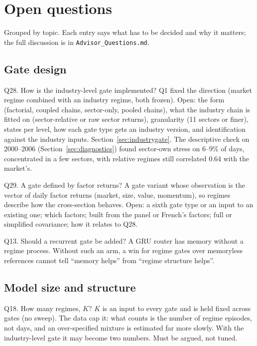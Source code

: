 \section{Open questions}
\label{sec:open}

Grouped by topic. Each entry says what has to be decided and why it matters; the full discussion is in
\texttt{Advisor\_Questions.md}.

\subsection{Gate design}

\begin{openbox}{Q28. How is the industry-level gate implemented?}
Q1 fixed the direction (market regime combined with an industry regime, both frozen). Open: the form
(factorial, coupled chains, sector-only, pooled chains), what the industry chain is fitted on
(sector-relative or raw sector returns), granularity (11 sectors or finer), states per level, how each
gate type gets an industry version, and identification against the industry inputs. Section~\ref{sec:industrygate}. The descriptive check on 2000--2006 (Section~\ref{sec:diagnostics}) found sector-own stress on 6--9\% of days,
concentrated in a few sectors, with relative regimes still correlated 0.64 with the market's.
\end{openbox}

\begin{openbox}{Q29. A gate defined by factor returns?}
A gate variant whose observation is the vector of daily factor returns (market, size, value, momentum),
so regimes describe how the cross-section behaves. Open: a sixth gate type or an input to an existing
one; which factors; built from the panel or French's factors; full or simplified covariance; how it
relates to Q28.
\end{openbox}

\begin{openbox}{Q13. Should a recurrent gate be added?}
A GRU router has memory without a regime process. Without such an arm, a win for regime gates over
memoryless references cannot tell ``memory helps'' from ``regime structure helps''.
\end{openbox}

\subsection{Model size and structure}

\begin{openbox}{Q18. How many regimes, $K$?}
$K$ is an input to every gate and is held fixed across gates (no sweep). The data cap it: what counts
is the number of regime episodes, not days, and an over-specified mixture is estimated far more slowly.
With the industry-level gate it may become two numbers. Must be argued, not tuned.
\end{openbox}

